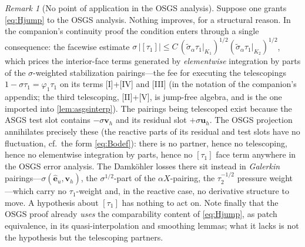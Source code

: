 \documentclass[11pt]{article}
\theoremstyle{remark}
\newtheorem{remark}[theorem]{Remark}
\newcommand{\bu}{\boldsymbol{u}}
\newcommand{\bv}{\boldsymbol{v}}
\newcommand{\st}{\widetilde{\sigma}_\alpha}
\begin{document}
\begin{remark}[No point of application in the OSGS analysis]
\label{rem:inert}
Suppose one grants \cref{eq:Hjump} to the OSGS analysis. Nothing improves, for a
structural reason. In the companion's continuity proof the condition enters through
a single consequence: the facewise estimate
$\sigma\,\bigl|[\tau_1]\bigr| \le C\,
(\st\tau_1|_{K_1})^{1/2}(\st\tau_1|_{K_2})^{1/2}$, which prices the interior-face
terms generated by \emph{elementwise} integration by parts of the $\sigma$-weighted
stabilization pairings---the fee for executing the telescopings
$1 - \sigma\tau_1 = \varphi_1\tau_1$ on its terms [I]+[IV] and [III] (in the
notation of the companion's appendix; the third telescoping, [II]+[V], is jump-free
algebra, and is the one imported into \cref{lem:asgsinterp}). The pairings being
telescoped exist because the ASGS test slot contains $-\sigma\bv_h$ and its residual
slot $+\sigma\bu_h$. The OSGS projection annihilates precisely these
(the reactive parts of its residual and test slots have no fluctuation, cf.\ the
form \cref{eq:Bodef}): there is no partner, hence no telescoping, hence no
elementwise integration by parts, hence no $[\tau_1]$ face term anywhere in the OSGS
error analysis. The Damk\"ohler losses there sit instead in \emph{Galerkin}
pairings---$\sigma(\hat{\boldsymbol e}_u, \bv_h)$, the $\sigma^{1/2}$-part of the
$\alpha X$-pairing, the $\tau_2^{-1/2}$ pressure weight---which carry no
$\tau_1$-weight and, in the reactive case, no derivative structure to move. A
hypothesis about $[\tau_1]$ has nothing to act on. Note finally that the OSGS proof
already \emph{uses} the comparability content of \cref{eq:Hjump}, as patch
equivalence, in its quasi-interpolation and smoothing lemmas; what it lacks is not
the hypothesis but the telescoping partners.
\end{remark}
\end{document}
